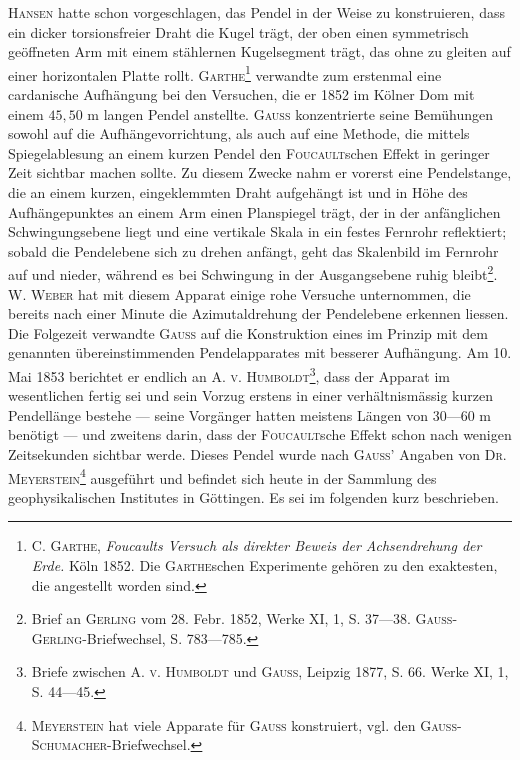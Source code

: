 \textsc{Hansen} hatte schon vorgeschlagen, das Pendel in der Weise zu konstruieren,
dass ein dicker torsionsfreier Draht die Kugel trägt, der oben einen
\clearpage{}
\noindent symmetrisch geöffneten Arm mit einem stählernen Kugelsegment trägt, das
ohne zu gleiten auf einer horizontalen Platte rollt. \textsc{Garthe}\footnote{C. \textsc{Garthe}, \textit{Foucaults Versuch als direkter Beweis der Achsendrehung der Erde.} Köln 1852.
Die \textsc{Garthe}schen Experimente gehören zu den exaktesten, die angestellt worden sind.} verwandte zum
erstenmal eine cardanische Aufhängung bei den Versuchen, die er 1852 im
Kölner Dom mit einem $45{,}50$ m langen Pendel anstellte. \textsc{Gauss} konzentrierte
seine Bemühungen sowohl auf die Aufhängevorrichtung, als auch auf eine
Methode, die mittels Spiegelablesung an einem kurzen Pendel den \textsc{Foucault}schen
Effekt in geringer Zeit sichtbar machen sollte. Zu diesem Zwecke
nahm er vorerst eine Pendelstange, die an einem kurzen, eingeklemmten Draht
aufgehängt ist und in Höhe des Aufhängepunktes an einem Arm einen Planspiegel
trägt, der in der anfänglichen Schwingungsebene liegt und eine vertikale
Skala in ein festes Fernrohr reflektiert; sobald die Pendelebene sich zu drehen
anfängt, geht das Skalenbild im Fernrohr auf und nieder, während es bei
Schwingung in der Ausgangsebene ruhig bleibt\footnote{Brief an \textsc{Gerling} vom 28. Febr. 1852, Werke XI, 1, S. 37—38. \textsc{Gauss-Gerling}-Briefwechsel,
S. 783—785.}. W. \textsc{Weber} hat mit diesem
Apparat einige rohe Versuche unternommen, die bereits nach einer Minute
die Azimutaldrehung der Pendelebene erkennen liessen. Die Folgezeit verwandte
\textsc{Gauss} auf die Konstruktion eines im Prinzip mit dem genannten übereinstimmenden
Pendelapparates mit besserer Aufhängung. Am 10. Mai 1853
berichtet er endlich an \textsc{A. v. Humboldt}\footnote{Briefe zwischen \textsc{A. v. Humboldt} und \textsc{Gauss}, Leipzig 1877, S. 66. Werke XI, 1, S. 44—45.}, dass der Apparat im wesentlichen
fertig sei und sein Vorzug erstens in einer verhältnismässig kurzen Pendellänge
bestehe — seine Vorgänger hatten meistens Längen von 30—60 m
benötigt — und zweitens darin, dass der \textsc{Foucault}sche Effekt schon nach
wenigen Zeitsekunden sichtbar werde. Dieses Pendel wurde nach \textsc{Gauss}’ Angaben
von \textsc{Dr. Meyerstein}\footnote{\textsc{Meyerstein} hat viele Apparate für \textsc{Gauss} konstruiert, vgl. den \textsc{Gauss-Schumacher}-Briefwechsel.} ausgeführt und befindet sich heute in der Sammlung
des geophysikalischen Institutes in Göttingen. Es sei im folgenden kurz
beschrieben.

